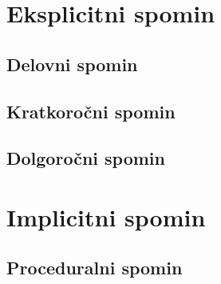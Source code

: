 \documentclass[10pt,a4paper]{article}
\begin{document}
\section{Eksplicitni spomin}
\subsection{Delovni spomin}

\subsection{Kratkoročni spomin}

\subsection{Dolgoročni spomin}

\section{Implicitni spomin}
\subsection{Proceduralni spomin}


\section{}
\end{document}
